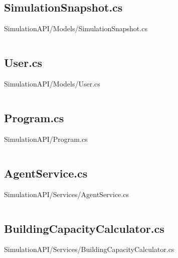 \inputminted[linenos,breaklines,tabsize=2]{csharp}{/Users/Henry/Desktop/NEAComputerScience/SimulationAPI/Models/SimulationMetric.cs}

\makeatletter
\subsection*{SimulationSnapshot.cs}
SimulationAPI/Models/SimulationSnapshot.cs
\def\@currentlabelname{SimulationSnapshot.cs}
\label{code:SimulationAPI:Models:SimulationSnapshot.cs}
\makeatother

\inputminted[linenos,breaklines,tabsize=2]{csharp}{/Users/Henry/Desktop/NEAComputerScience/SimulationAPI/Models/SimulationSnapshot.cs}

\makeatletter
\subsection*{User.cs}
SimulationAPI/Models/User.cs
\def\@currentlabelname{User.cs}
\label{code:SimulationAPI:Models:User.cs}
\makeatother

\inputminted[linenos,breaklines,tabsize=2]{csharp}{/Users/Henry/Desktop/NEAComputerScience/SimulationAPI/Models/User.cs}

\makeatletter
\subsection*{Program.cs}
SimulationAPI/Program.cs
\def\@currentlabelname{Program.cs}
\label{code:SimulationAPI:Program.cs}
\makeatother

\inputminted[linenos,breaklines,tabsize=2]{csharp}{/Users/Henry/Desktop/NEAComputerScience/SimulationAPI/Program.cs}

\makeatletter
\subsection*{AgentService.cs}
SimulationAPI/Services/AgentService.cs
\def\@currentlabelname{AgentService.cs}
\label{code:SimulationAPI:Services:AgentService.cs}
\makeatother

\inputminted[linenos,breaklines,tabsize=2]{csharp}{/Users/Henry/Desktop/NEAComputerScience/SimulationAPI/Services/AgentService.cs}

\makeatletter
\subsection*{BuildingCapacityCalculator.cs}
SimulationAPI/Services/BuildingCapacityCalculator.cs
\def\@currentlabelname{BuildingCapacityCalculator.cs}
\label{code:SimulationAPI:Services:BuildingCapacityCalculator.cs}
\makeatother

